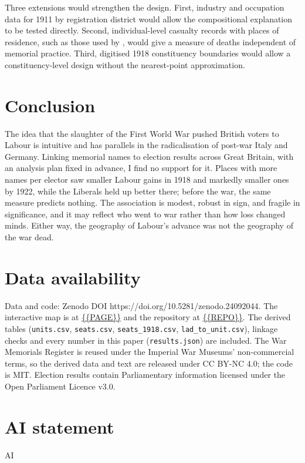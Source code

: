 \documentclass[11pt,a4paper]{article}
\begin{document}
Three extensions would strengthen the design. First, industry and occupation data for 1911 by registration district would allow the compositional explanation to be tested directly. Second, individual-level casualty records with places of residence, such as those used by \citet{carozzi2023}, would give a measure of deaths independent of memorial practice. Third, digitised 1918 constituency boundaries would allow a constituency-level design without the nearest-point approximation.

\section{Conclusion}
The idea that the slaughter of the First World War pushed British voters to Labour is intuitive and has parallels in the radicalisation of post-war Italy and Germany. Linking memorial names to election results across Great Britain, with an analysis plan fixed in advance, I find no support for it. Places with more names per elector saw smaller Labour gains in 1918 and markedly smaller ones by 1922, while the Liberals held up better there; before the war, the same measure predicts nothing. The association is modest, robust in sign, and fragile in significance, and it may reflect who went to war rather than how loss changed minds. Either way, the geography of Labour's advance was not the geography of the war dead.

\section*{Data availability}
Data and code: Zenodo DOI https://doi.org/10.5281/zenodo.24092044. The interactive map is at \url{{{PAGE}}} and the repository at \url{{{REPO}}}. The derived tables (\texttt{units.csv}, \texttt{seats.csv}, \texttt{seats\_1918.csv}, \texttt{lad\_to\_unit.csv}), linkage checks and every number in this paper (\texttt{results.json}) are included. The War Memorials Register is reused under the Imperial War Museums' non-commercial terms, so the derived data and text are released under CC BY-NC 4.0; the code is MIT. Election results contain Parliamentary information licensed under the Open Parliament Licence v3.0.

\section*{AI statement}
{{AI}}
\end{document}
